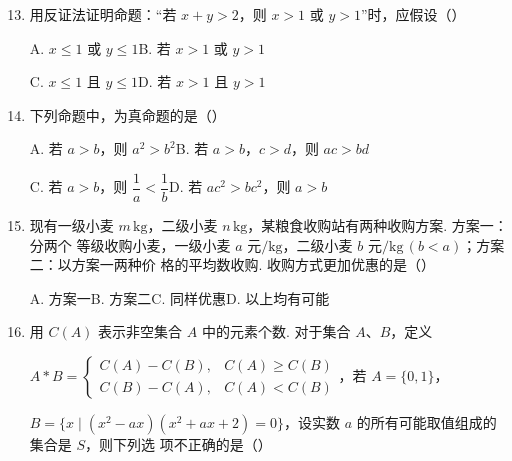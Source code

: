 \documentclass[a4paper,11pt]{article}
\begin{document}
\begin{enumerate}
\setcounter{enumi}{12}

\item 用反证法证明命题：“若 $x+y>2$，则 $x>1$ 或 $y>1$”时，应假设\mbox{（\quad）}

\keepwithprev
A. $x\leqslant1$ 或 $y\leqslant1$\qquad B. 若 $x>1$ 或 $y>1$

C. $x\leqslant1$ 且 $y\leqslant1$\qquad D. 若 $x>1$ 且 $y>1$

\ifanswer
{}
\fi

\item 下列命题中，为真命题的是\mbox{（\quad）}

\keepwithprev
A. 若 $a>b$，则 $a^2>b^2$\qquad B. 若 $a>b$，$c>d$，则 $ac>bd$

C. 若 $a>b$，则 $\dfrac1a<\dfrac1b$\qquad D. 若 $ac^2>bc^2$，则 $a>b$

\ifanswer
\solbegin
{}
\solend
\fi

\item 现有一级小麦 $m\,\mathrm{kg}$，二级小麦 $n\,\mathrm{kg}$，某粮食收购站有两种收购方案. 方案一：分两个
等级收购小麦，一级小麦 $a$ 元$/\mathrm{kg}$，二级小麦 $b$ 元$/\mathrm{kg}\,(b<a)$；方案二：以方案一两种价
格的平均数收购. 收购方式更加优惠的是\mbox{（\quad）}

\keepwithprev
A. 方案一\qquad B. 方案二\qquad C. 同样优惠\qquad D. 以上均有可能

\ifanswer
\solbegin
{}
\solend
\fi

\item 用 $C(A)$ 表示非空集合 $A$ 中的元素个数. 对于集合 $A$、$B$，定义

$A*B=\begin{cases}C(A)-C(B),&C(A)\geqslant C(B)\\ C(B)-C(A),&C(A)<C(B)\end{cases}$，若 $A=\{0,1\}$，

$B=\{x\mid(x^2-ax)(x^2+ax+2)=0\}$，设实数 $a$ 的所有可能取值组成的集合是 $S$，则下列选
项不正确的是\mbox{（\quad）}


\end{enumerate}
\end{document}
